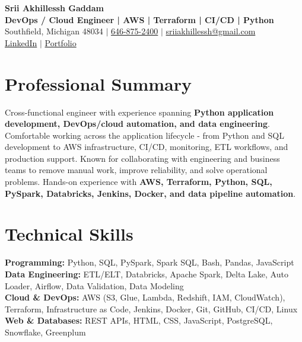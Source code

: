 \documentclass[letterpaper,10pt]{article}
\begin{document}
\fontsize{9.35pt}{10.45pt}\selectfont

\begin{center}
    {\LARGE \textbf{Srii Akhillessh Gaddam}} \\[-1pt]
    \textbf{DevOps / Cloud Engineer | AWS | Terraform | CI/CD | Python} \\[2pt]
    Southfield, Michigan 48034 $|$
    \href{tel:6468752400}{646-875-2400} $|$
    \href{mailto:sriiakhillessh@gmail.com}{sriiakhillessh@gmail.com} \\[1pt]
    \href{https://www.linkedin.com/in/srii-akhiilessh-gaddam-b48668191/}{LinkedIn} $|$
    \href{https://sriiakhillesshg.github.io/portfolio/}{Portfolio}
\end{center}
\vspace{-8pt}

\section{Professional Summary}
\small{Cross-functional engineer with experience spanning \textbf{Python application development, DevOps/cloud automation, and data engineering}. Comfortable working across the application lifecycle - from Python and SQL development to AWS infrastructure, CI/CD, monitoring, ETL workflows, and production support. Known for collaborating with engineering and business teams to remove manual work, improve reliability, and solve operational problems. Hands-on experience with \textbf{AWS, Terraform, Python, SQL, PySpark, Databricks, Jenkins, Docker, and data pipeline automation}.}

\section{Technical Skills}
\small{
\textbf{Programming:} Python, SQL, PySpark, Spark SQL, Bash, Pandas, JavaScript \\
\textbf{Data Engineering:} ETL/ELT, Databricks, Apache Spark, Delta Lake, Auto Loader, Airflow, Data Validation, Data Modeling \\
\textbf{Cloud \& DevOps:} AWS (S3, Glue, Lambda, Redshift, IAM, CloudWatch), Terraform, Infrastructure as Code, Jenkins, Docker, Git, GitHub, CI/CD, Linux \\
\textbf{Web \& Databases:} REST APIs, HTML, CSS, JavaScript, PostgreSQL, Snowflake, Greenplum
}
\end{document}
